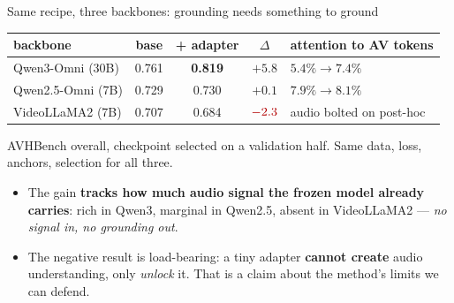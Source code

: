 \documentclass[aspectratio=169,11pt]{beamer}
\begin{document}
\begin{frame}{Same recipe, three backbones: grounding needs something to ground}
\centering
\renewcommand{\arraystretch}{1.2}
\small
\begin{tabular}{l cc c l}
\toprule
backbone & base & + adapter & $\Delta$ & attention to AV tokens \\
\midrule
Qwen3-Omni (30B)  & 0.761 & \textbf{0.819} & $+5.8$ & $5.4\% \to 7.4\%$ \\
Qwen2.5-Omni (7B) & 0.729 & 0.730 & $+0.1$ & $7.9\% \to 8.1\%$ \\
VideoLLaMA2 (7B)  & 0.707 & 0.684 & $\textcolor{red!70!black}{-2.3}$ & audio bolted on post-hoc \\
\bottomrule
\end{tabular}
\par\vspace{0.4em}
{\scriptsize AVHBench overall, checkpoint selected on a validation half. Same data, loss, anchors,
selection for all three.}
\vfill
\begin{itemize}\small
\item The gain \textbf{tracks how much audio signal the frozen model already carries}: rich in
Qwen3, marginal in Qwen2.5, absent in VideoLLaMA2 --- \emph{no signal in, no grounding out}.
\item The negative result is load-bearing: a tiny adapter \textbf{cannot create} audio
understanding, only \emph{unlock} it. That is a claim about the method's limits we can defend.
\end{itemize}
\end{frame}
\end{document}
